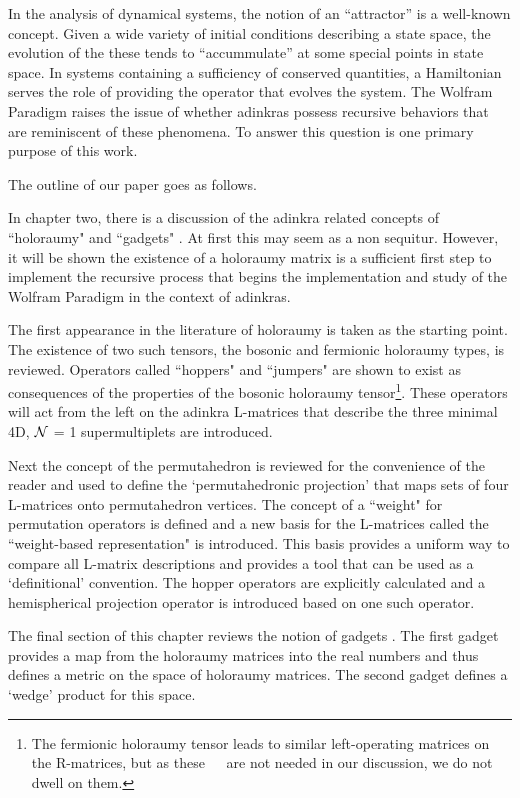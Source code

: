 \documentclass[12pt]{article}
\begin{document}
In the analysis of dynamical systems, the notion of an ``attractor'' \cite{X4} is a well-known concept. Given a 
wide variety of initial conditions describing a state space, the evolution of the these tends to ``accummulate'' 
at some special points in state space.  In systems containing a sufficiency of conserved quantities, a 
Hamiltonian serves the role of providing the operator that evolves the system.  The Wolfram Paradigm raises 
the issue of whether adinkras possess recursive behaviors that are reminiscent of these phenomena.  To answer 
this question is one primary purpose of this work.

The outline of our paper goes as follows.

In chapter two, there is a discussion of the adinkra related concepts of ``holoraumy" and ``gadgets"
\cite{KIAS,K2,K3,K4,K5,K4g,K5g}.  At
first this may seem as a non sequitur.  However, it will be shown the existence of a holoraumy matrix 
is a sufficient first step to implement the recursive process that begins the implementation and study of the Wolfram Paradigm in the context of adinkras.  

The first appearance in the literature of holoraumy is taken as the starting point.  The existence of two such tensors, the bosonic and fermionic holoraumy types, is reviewed. Operators called ``hoppers" and ``jumpers" are shown to 
exist as consequences of the properties of the bosonic holoraumy tensor\footnote{The fermionic holoraumy tensor leads to similar left-operating matrices on the R-matrices, 
 but as these $~~~~$ are not needed in our discussion, we do not dwell on them.}.  These operators will act from 
 the left on the adinkra L-matrices that describe the three minimal 4D, $\cal N$ = 1 supermultiplets
 are introduced.  
 
Next the concept of the permutahedron is reviewed for the convenience of the reader and used to define the `permutahedronic projection' that maps sets of four 
L-matrices onto permutahedron vertices. The concept of a ``weight" for permutation operators is defined and
 a new basis for the L-matrices called the ``weight-based representation" is introduced. This basis provides a
 uniform way to compare all L-matrix descriptions and provides a tool that can be used as a `definitional'
convention.  The hopper operators are explicitly
 calculated and a hemispherical projection operator is introduced based on one such operator.

The final section of this chapter reviews the notion of
gadgets \cite{K2,K3,K4,K5,K4g,K5g,6}.  The first gadget 
provides a map from the holoraumy matrices into the
real numbers and thus defines a metric on the space of
holoraumy matrices.  The second gadget defines a `wedge'
product for this space.
 
\end{document}
